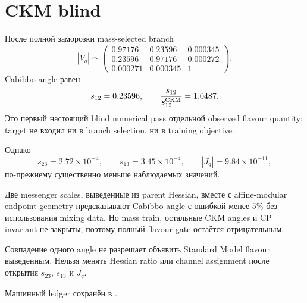\section{CKM blind}

После полной заморозки mass-selected branch
\begin{equation}
 |V_q|\simeq
 \begin{pmatrix}
 0.97176&0.23596&0.000345\\
 0.23596&0.97176&0.000272\\
 0.000271&0.000345&1
 \end{pmatrix}.
\end{equation}
Cabibbo angle равен
\begin{equation}
 s_{12}=0.23596,
 \qquad
 \frac{s_{12}}{s_{12}^{\rm CKM}}=1.0487.
\end{equation}
Это первый настоящий blind numerical pass отдельной observed flavour
quantity: target не входил ни в branch selection, ни в training objective.

Однако
\begin{equation}
 s_{23}=2.72\times10^{-4},
 \qquad
 s_{13}=3.45\times10^{-4},
 \qquad
 |J_q|=9.84\times10^{-11},
\end{equation}
по-прежнему существенно меньше наблюдаемых значений.

\begin{theorem}
Две messenger scales, выведенные из parent Hessian, вместе с affine-modular
endpoint geometry предсказывают Cabibbo angle с ошибкой менее \(5\%\) без
использования mixing data. Но mass train, остальные CKM angles и CP invariant
не закрыты, поэтому полный flavour gate остаётся отрицательным.
\end{theorem}

\begin{nogocriterion}
Совпадение одного angle не разрешает объявить Standard Model flavour
выведенным. Нельзя менять Hessian ratio или channel assignment после открытия
\(s_{23}\), \(s_{13}\) и \(J_q\).
\end{nogocriterion}

Машинный ledger сохранён в
.